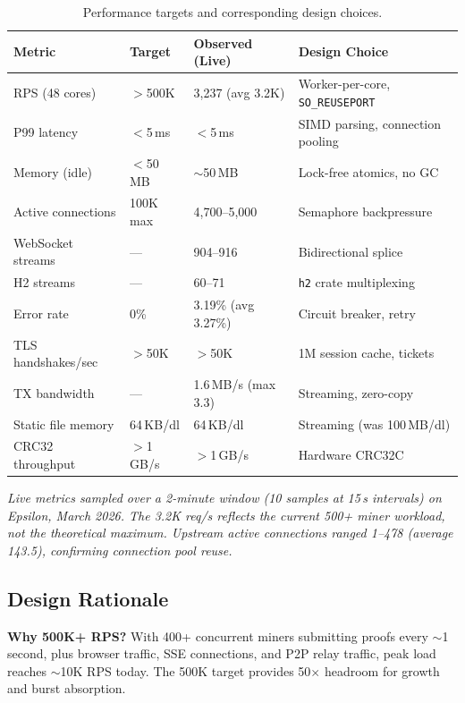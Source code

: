 \documentclass[a4paper, 11pt]{article}
\begin{document}
\begin{table}[H]
\centering
\caption{Performance targets and corresponding design choices.}
\label{tab:perf}
\begin{tabular}{@{}lll@{}}
\toprule
\textbf{Metric} & \textbf{Target} & \textbf{Observed (Live)} & \textbf{Design Choice} \\
\midrule
RPS (48 cores)         & $>$500K      & 3,237 (avg 3.2K)  & Worker-per-core, \texttt{SO\_REUSEPORT} \\
P99 latency            & $<$5\,ms     & $<$5\,ms           & SIMD parsing, connection pooling \\
Memory (idle)          & $<$50\,MB    & $\sim$50\,MB       & Lock-free atomics, no GC \\
Active connections     & 100K max     & 4,700--5,000       & Semaphore backpressure \\
WebSocket streams      & ---          & 904--916           & Bidirectional splice \\
H2 streams             & ---          & 60--71             & \texttt{h2} crate multiplexing \\
Error rate             & 0\%          & 3.19\% (avg 3.27\%) & Circuit breaker, retry \\
TLS handshakes/sec     & $>$50K       & $>$50K             & 1M session cache, tickets \\
TX bandwidth           & ---          & 1.6\,MB/s (max 3.3) & Streaming, zero-copy \\
Static file memory     & 64\,KB/dl    & 64\,KB/dl          & Streaming (was 100\,MB/dl) \\
CRC32 throughput       & $>$1\,GB/s   & $>$1\,GB/s         & Hardware CRC32C \\
\bottomrule
\end{tabular}
\end{table}

\vspace{0.5em}
\noindent\textit{Live metrics sampled over a 2-minute window (10 samples at 15\,s intervals)
on Epsilon, March 2026.  The 3.2K req/s reflects the current 500+ miner workload,
not the theoretical maximum.  Upstream active connections ranged 1--478
(average 143.5), confirming connection pool reuse.}

\subsection{Design Rationale}

\textbf{Why 500K+ RPS?}  With 400+ concurrent miners submitting proofs
every $\sim$1 second, plus browser traffic, SSE connections, and P2P
relay traffic, peak load reaches $\sim$10K RPS today.  The 500K target
provides 50$\times$ headroom for growth and burst absorption.
\end{document}
